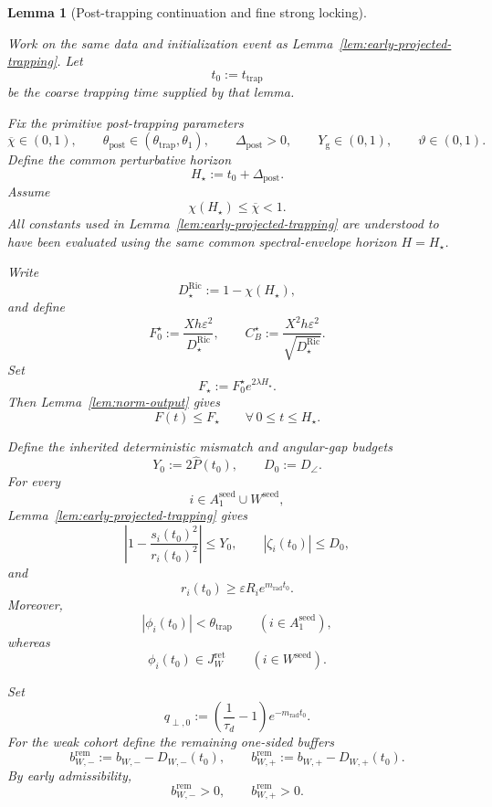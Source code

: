 \documentclass{article} %
\theoremstyle{plain}
\newtheorem{lemma}[theorem]{Lemma}
\theoremstyle{definition}
\theoremstyle{remark}
\begin{document}

\begin{lemma}[Post-trapping continuation and fine strong locking]
\label{lem:post-trapping-locking}

Work on the same data and initialization event as
Lemma~\ref{lem:early-projected-trapping}.  Let
\[
t_0:=t_{\mathrm{trap}}
\]
be the coarse trapping time supplied by that lemma.

Fix the primitive post-trapping parameters
\[
\boxed{
\overline\chi\in(0,1),
\qquad
\theta_{\mathrm{post}}\in(\theta_{\mathrm{trap}},\theta_1),
\qquad
\Delta_{\mathrm{post}}>0,
\qquad
Y_{\mathrm g}\in(0,1),
\qquad
\vartheta\in(0,1).
}
\]
Define the common perturbative horizon
\[
\boxed{
H_\star:=t_0+\Delta_{\mathrm{post}}.
}
\]
Assume
\[
\boxed{
\chi(H_\star)\le\overline\chi<1.
}
\]
All constants used in Lemma~\ref{lem:early-projected-trapping} are understood
to have been evaluated using the same common spectral-envelope horizon
$H=H_\star$.

Write
\[
D_\star^{\mathrm{Ric}}:=1-\chi(H_\star),
\]
and define
\[
\boxed{
F_0^\star:=\frac{Xh\varepsilon^2}{D_\star^{\mathrm{Ric}}},
\qquad
C_B^\star:=\frac{X^2h\varepsilon^2}{\sqrt{D_\star^{\mathrm{Ric}}}}.
}
\]
Set
\[
\boxed{
F_\star:=F_0^\star e^{2\lambda H_\star}.
}
\]
Then Lemma~\ref{lem:norm-output} gives
\[
F(t)\le F_\star
\qquad
\forall\,0\le t\le H_\star.
\]


Define the inherited deterministic mismatch and angular-gap budgets
\[
\boxed{
Y_0:=2\widehat P(t_0),
\qquad
D_0:=D_\angle.
}
\]
For every
\[
i\in A_1^{\mathrm{seed}}\cup W^{\mathrm{seed}},
\]
Lemma~\ref{lem:early-projected-trapping} gives
\[
\left|1-\frac{s_i(t_0)^2}{r_i(t_0)^2}\right|\le Y_0,
\qquad
|\zeta_i(t_0)|\le D_0,
\]
and
\[
r_i(t_0)\ge\varepsilon R_i e^{m_{\mathrm{rad}}t_0}.
\]
Moreover,
\[
|\phi_i(t_0)|<\theta_{\mathrm{trap}}
\qquad(i\in A_1^{\mathrm{seed}}),
\]
whereas
\[
\phi_i(t_0)\in J_W^{\mathrm{ret}}
\qquad(i\in W^{\mathrm{seed}}).
\]

Set
\[
\boxed{
q_{\perp,0}
:=
\left(\frac1{\tau_d}-1\right)e^{-m_{\mathrm{rad}}t_0}.
}
\]
For the weak cohort define the remaining one-sided buffers
\[
\boxed{
b_{W,-}^{\mathrm{rem}}
:=b_{W,-}-D_{W,-}(t_0),
\qquad
b_{W,+}^{\mathrm{rem}}
:=b_{W,+}-D_{W,+}(t_0).
}
\]
By early admissibility,
\[
b_{W,-}^{\mathrm{rem}}>0,
\qquad
b_{W,+}^{\mathrm{rem}}>0.
\]


\end{lemma}
\end{document}
